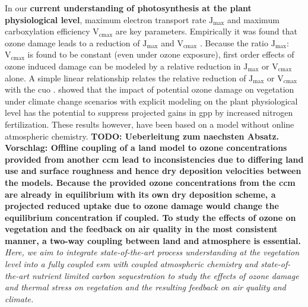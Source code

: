 In our \textbf{current understanding of photosynthesis at the plant physiological level}, maximum electron transport rate $\mathrm{J_{max}}$ and maximum carboxylation efficiency $\mathrm{V_{cmax}}$ are key parameters. Empirically it was found that ozone damage leads to a reduction of  $\mathrm{J_{max}}$ and $\mathrm{V_{cmax}}$ \parencite{EJA:Emberson2018}. Because the ratio $\mathrm{J_{max}}$:$\mathrm{V_{cmax}}$ is found to be constant (even under ozone exposure), first order effects of ozone induced damage can be modeled by a relative reduction in $\mathrm{J_{max}}$ or $\mathrm{V_{cmax}}$ alone. A simple linear relationship relates the relative reduction of $\mathrm{J_{max}}$ or $\mathrm{V_{cmax}}$ with the \gls{cuo} \parencites{BGS:Franz2017}{BGS:Franz2018}. \textcite{BGSD:Franz2020} showed that the impact of potential ozone damage on vegetation under climate change scenarios with explicit modeling on the plant physiological level has the potential to suppress projected gains in \gls{gpp} by increased nitrogen fertilization. These results however, have been based on a model without online atmospheric chemistry. \textbf{TODO: Ueberleitung zum naechsten Absatz. Vorschlag: Offline coupling of a land model to ozone concentrations provided from another \gls{ccm} lead to inconsistencies due to differing land use and surface roughness and hence dry deposition velocities between the models. Because the provided ozone concentrations from the \gls{ccm} are already in equilibrium with its own dry deposition scheme, a projected reduced uptake due to ozone damage would change the equilibrium concentration if coupled. To study the effects of ozone on vegetation and the feedback on air quality in the most consistent manner, a two-way coupling between land and atmosphere is essential.}\\

\emph{Here, we aim to integrate state-of-the-art  process understanding at the vegetation level into a fully coupled \gls{esm} with coupled atmospheric chemistry and state-of-the-art nutrient limited carbon sequestration to study the effects of  ozone damage and thermal stress on vegetation and the resulting feedback on air quality  and climate.}

